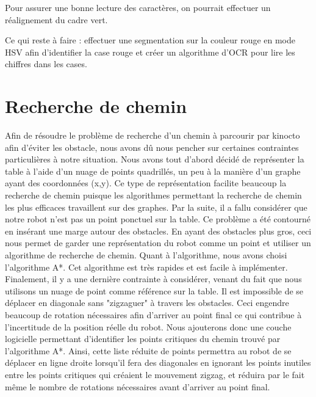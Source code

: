 Pour assurer une bonne lecture des caractères, on pourrait effectuer un réalignement du cadre vert.

Ce qui reste à faire : effectuer une segmentation sur la couleur rouge en mode HSV afin d'identifier la case rouge et créer un algorithme d'OCR pour lire les chiffres dans les cases.

\section{Recherche de chemin}
Afin de résoudre le problème de recherche d'un chemin à parcourir par kinocto afin d'éviter les obstacle, nous avons dû nous pencher sur certaines contraintes particulières à notre situation. Nous avons tout d'abord décidé de représenter la table à l'aide d'un nuage de points quadrillés, un peu à la manière d'un graphe ayant des coordonnées (x,y). Ce type de représentation facilite beaucoup la recherche de chemin puisque les algorithmes permettant la recherche de chemin les plus efficaces travaillent sur des graphes.  Par la suite, il a fallu considérer que notre robot n'est pas un point ponctuel sur la table. Ce problème a été contourné en insérant une marge autour des obstacles. En ayant des obstacles plus gros, ceci nous permet de garder une représentation du robot comme un point et utiliser un algorithme de recherche de chemin. Quant à l'algorithme, nous avons choisi l'algorithme A*. Cet algorithme est très rapides et est facile à implémenter. Finalement, il y a une dernière contrainte à considérer, venant du fait que nous utilisons un nuage de point comme référence sur la table. Il est impossible de se déplacer en diagonale sans "zigzaguer" à travers les obstacles. Ceci engendre beaucoup de rotation nécessaires afin d'arriver au point final ce qui contribue à l'incertitude de la position réelle du robot. Nous ajouterons donc une couche logicielle permettant d'identifier les points critiques du chemin trouvé par l'algorithme A*. Ainsi, cette liste réduite de points permettra au robot de se déplacer en ligne droite lorsqu'il fera des diagonales en ignorant les points inutiles entre les points critiques qui créaient le mouvement zigzag, et réduira par le fait même le nombre de rotations nécessaires avant d'arriver au point final. 

